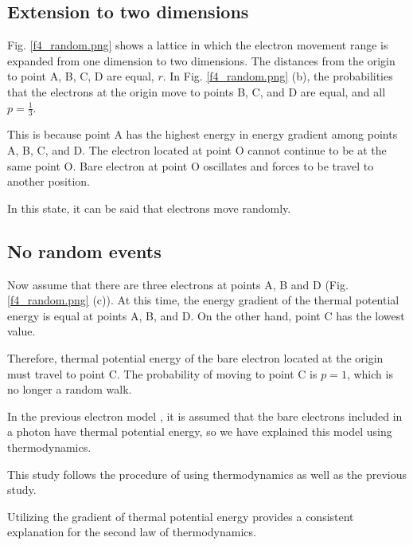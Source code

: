 \documentclass[reprint,amsmath,amssymb,aps,]{revtex4-1}
\numberwithin{equation}{section}%
\begin{document}
\subsection{
    \label{Extension to two dimensions}Extension to two dimensions}

    Fig. \ref{f4_random.png} shows a lattice in which the electron movement range is expanded from one dimension to two dimensions. The distances from the origin to point A, B, C, D are equal, $r$. In Fig. \ref{f4_random.png} (b), the probabilities that the electrons at the origin move to points B, C, and D are equal, and all $ p = \frac{1}{3} $.

    This is because point A has the highest energy in energy gradient among points A, B, C, and D. The electron located at point O cannot continue to be at the same point O. Bare electron at point O oscillates and forces to be travel to another position.

    In this state, it can be said that electrons move randomly.


\subsection{
    \label{sec:No random events}No random events}

    Now assume that there are three electrons at points A, B and D (Fig. \ref{f4_random.png} (c)). At this time, the energy gradient of the thermal potential energy is equal at points A, B, and D. On the other hand, point C has the lowest value.

    Therefore, thermal potential energy of the bare electron  located at the origin must travel to point C. The probability of moving to point C is $p = 1$, which is no longer a random walk.
    
    In the previous electron model \cite{Hanamura1}, it is assumed that the bare electrons included in a photon have thermal potential energy, so we have explained this model using thermodynamics.

    This study follows the procedure of using thermodynamics as well as the previous study.
    
    Utilizing the gradient of thermal potential energy provides a consistent explanation for the second law of thermodynamics.
\end{document}
